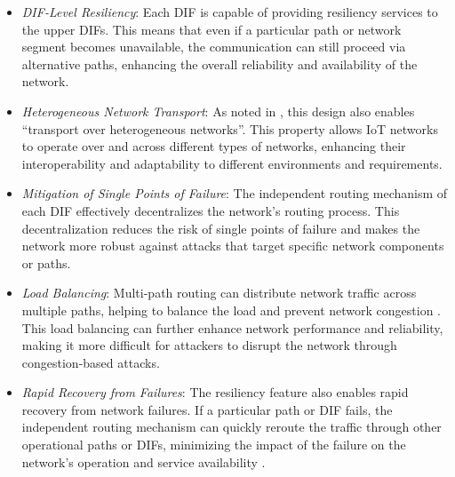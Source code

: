 \documentclass{ieeeaccess}
\begin{document}
\begin{itemize}
	\item \textit{DIF-Level Resiliency}: Each DIF is capable of providing resiliency services to the upper DIFs. This means that even if a particular path or network segment becomes unavailable, the communication can still proceed via alternative paths, enhancing the overall reliability and availability of the network.
	\item \textit{Heterogeneous Network Transport}: As noted in \cite{Trouva:2011:TOH}, this design also enables ``transport over heterogeneous networks''. This property allows IoT networks to operate over and across different types of networks, enhancing their interoperability and adaptability to different environments and requirements.
	\item \textit{Mitigation of Single Points of Failure}: The independent routing mechanism of each DIF effectively decentralizes the network's routing process. This decentralization reduces the risk of single points of failure and makes the network more robust against attacks that target specific network components or paths.
	\item \textit{Load Balancing}: Multi-path routing can distribute network traffic across multiple paths, helping to balance the load and prevent network congestion \cite{marek2019high}. This load balancing can further enhance network performance and reliability, making it more difficult for attackers to disrupt the network through congestion-based attacks.
	\item \textit{Rapid Recovery from Failures}: The resiliency feature also enables rapid recovery from network failures. If a particular path or DIF fails, the independent routing mechanism can quickly reroute the traffic through other operational paths or DIFs, minimizing the impact of the failure on the network's operation and service availability \cite{neelam2021applicability}.
\end{itemize}
\end{document}
